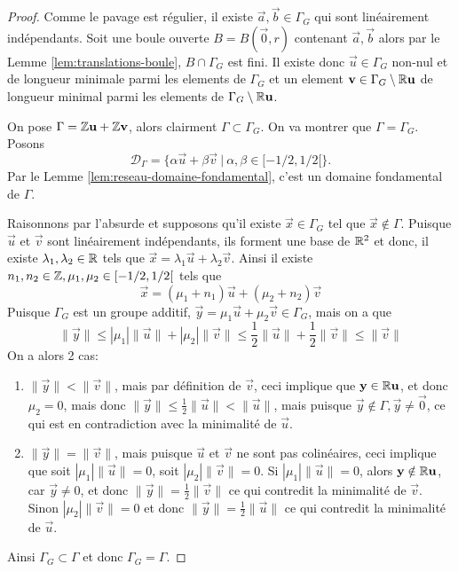 \begin{proof}
	Comme le pavage est régulier, il existe $\vec{a}, \vec{b} \in \Gamma_G$ qui
	sont linéairement indépendants. Soit une boule ouverte $B = B(\vec{0}, r)$
	contenant $\vec{a}, \vec{b}$ alors par le Lemme \ref{lem:translations-boule},
	$B \cap \Gamma_G$ est fini.
	Il existe donc $\vec{u} \in \Gamma_G$ non-nul et de longueur minimale parmi
	les elements de $\Gamma_G$ et un element
	$\mathbf{v} \in \Gamma_G \setminus \mathbb{R}\mathbf{u}$ de longueur minimal parmi
	les elements de $\Gamma_G \setminus \mathbb{R}\mathbf{u}$.

	On pose $\Gamma = \mathbb{Z}\mathbf{u} + \mathbb{Z}\mathbf{v}$, alors clairment
	$\Gamma \subset \Gamma_G$. On va montrer que $\Gamma = \Gamma_G$.
	Posons
	\begin{equation*}
		\mathcal{D}_\Gamma = \{\alpha\vec{u} + \beta\vec{v}\ |\ 
		\alpha, \beta \in [-1/2, 1/2[\}.
	\end{equation*}
	Par le Lemme \ref{lem:reseau-domaine-fondamental}, c'est un domaine fondamental
	de $\Gamma$.

	Raisonnons par l'absurde et supposons qu'il existe $\vec{x} \in \Gamma_G$
	tel que $\vec{x} \notin \Gamma$. Puisque $\vec{u}$ et $\vec{v}$ sont
	linéairement indépendants, ils forment une base de $\mathbb{R}^2$ et donc, il existe 
	$\lambda_1, \lambda_2 \in \mathbb{R}$ tels que
	$\vec{x} = \lambda_1 \vec{u} + \lambda_2 \vec{v}$. Ainsi il existe
	${n_1, n_2 \in \mathbb{Z}}, {\mu_1, \mu_2 \in [-1/2, 1/2[}$ tels que
	\begin{equation*}
		\vec{x} = (\mu_1 + n_1)\vec{u} + (\mu_2 + n_2)\vec{v}
	\end{equation*}
	Puisque $\Gamma_G$ est un groupe additif,
	$\vec{y} = \mu_1\vec{u} + \mu_2\vec{v} \in \Gamma_G$, mais on a que
	\begin{equation*}
		\|\vec{y}\| \leq |\mu_1|\|\vec{u}\| + |\mu_2|\|\vec{v}\|
		\leq \frac{1}{2}\|\vec{u}\| + \frac{1}{2}\|\vec{v}\| \leq \|\vec{v}\|
	\end{equation*}
	On a alors 2 cas:
	\begin{enumerate}
		\item	$\|\vec{y}\| < \|\vec{v}\|$, mais par définition de $\vec{v}$, ceci
			implique que $\mathbf{y} \in \mathbb{R}\mathbf{u}$, et donc $\mu_2 = 0$, mais donc
			$\|\vec{y}\| \leq \frac{1}{2}\|\vec{u}\| < \|\vec{u}\|$, mais puisque
			$\vec{y} \notin \Gamma, \vec{y} \neq \vec{0}$, ce qui
			est en contradiction avec la minimalité de $\vec{u}$.
		\item $\|\vec{y}\| = \|\vec{v}\|$, mais puisque $\vec{u}$ et $\vec{v}$
			ne sont pas colinéaires, ceci implique que soit $|\mu_1|\|\vec{u}\| = 0$,
			soit $|\mu_2|\|\vec{v}\| = 0$. Si $|\mu_1|\|\vec{u}\| = 0$,
			alors $\mathbf{y} \notin \mathbb{R}\mathbf{u}$, car $\vec{y} \neq 0$, et donc
			$\|\vec{y}\| = \frac{1}{2}\|\vec{v}\|$ ce qui contredit la minimalité
			de $\vec{v}$. Sinon $|\mu_2|\|\vec{v}\| = 0$ et donc
			$\|\vec{y}\| = \frac{1}{2}\|\vec{u}\|$ ce qui contredit la minimalité
			de $\vec{u}$.
	\end{enumerate}
	Ainsi $\Gamma_G \subset \Gamma$ et donc $\Gamma_G = \Gamma$.
\end{proof}


